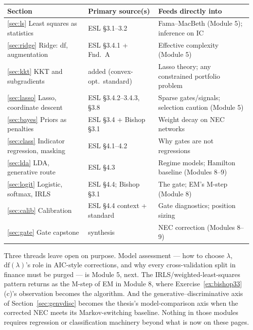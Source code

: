 \documentclass[11pt]{article}
\numberwithin{equation}{section}
\theoremstyle{plain}
\theoremstyle{definition}
\theoremstyle{remark}
\begin{document}
\begin{center}
\small
\begin{tabular}{@{}lll@{}}
\toprule
Section & Primary source(s) & Feeds directly into \\
\midrule
\ref{sec:ls} Least squares as statistics & ESL \S3.1--3.2 & Fama--MacBeth (Module 5); inference on IC \\
\ref{sec:ridge} Ridge: df, augmentation & ESL \S3.4.1 + Fnd.\ A & Effective complexity (Module 5) \\
\ref{sec:kkt} KKT and subgradients & added (convex-opt.\ standard) & Lasso theory; any constrained portfolio problem \\
\ref{sec:lasso} Lasso, coordinate descent & ESL \S3.4.2--3.4.3, \S3.8 & Sparse gates/signals; selection caution (Module 5) \\
\ref{sec:bayes} Priors as penalties & ESL \S3.4 + Bishop \S3.1 & Weight decay on NEC networks \\
\ref{sec:class} Indicator regression, masking & ESL \S4.1--4.2 & Why gates are not regressions \\
\ref{sec:lda} LDA, generative route & ESL \S4.3 & Regime models; Hamilton baseline (Modules 8--9) \\
\ref{sec:logit} Logistic, softmax, IRLS & ESL \S4.4; Bishop \S3.1 & The gate; EM's M-step (Module 8) \\
\ref{sec:calib} Calibration & ESL \S4.4 context + standard & Gate diagnostics; position sizing \\
\ref{sec:gate} Gate capstone & synthesis & NEC correction (Modules 8--9) \\
\bottomrule
\end{tabular}
\end{center}

\medskip
Three threads leave open on purpose. Model assessment --- how to choose $\lambda$, $\mathrm{df}(\lambda)$'s role in AIC-style corrections, and why every cross-validation split in finance must be purged --- is Module 5, next. The IRLS/weighted-least-squares pattern returns as the M-step of EM in Module 8, where Exercise~\ref{ex:bishop33}(c)'s observation becomes the algorithm. And the generative--discriminative axis of Section~\ref{sec:genvdisc} becomes the thesis's model-comparison axis when the corrected NEC meets its Markov-switching baseline. Nothing in those modules requires regression or classification machinery beyond what is now on these pages.
\end{document}
